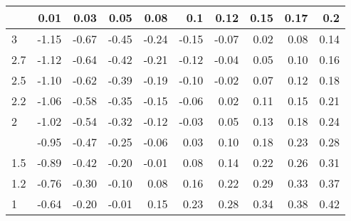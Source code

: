 
\begin{tabular}{lrrrrrrrrr}
\toprule
  & 0.01 & 0.03 & 0.05 & 0.08 & 0.1 & 0.12 & 0.15 & 0.17 & 0.2\\
\midrule
3 & -1.15 & -0.67 & -0.45 & -0.24 & -0.15 & -0.07 & 0.02 & 0.08 & 0.14\\
2.7 & -1.12 & -0.64 & -0.42 & -0.21 & -0.12 & -0.04 & 0.05 & 0.10 & 0.16\\
2.5 & -1.10 & -0.62 & -0.39 & -0.19 & -0.10 & -0.02 & 0.07 & 0.12 & 0.18\\
2.2 & -1.06 & -0.58 & -0.35 & -0.15 & -0.06 & 0.02 & 0.11 & 0.15 & 0.21\\
2 & -1.02 & -0.54 & -0.32 & -0.12 & -0.03 & 0.05 & 0.13 & 0.18 & 0.24\\
\addlinespace
1.7 & -0.95 & -0.47 & -0.25 & -0.06 & 0.03 & 0.10 & 0.18 & 0.23 & 0.28\\
1.5 & -0.89 & -0.42 & -0.20 & -0.01 & 0.08 & 0.14 & 0.22 & 0.26 & 0.31\\
1.2 & -0.76 & -0.30 & -0.10 & 0.08 & 0.16 & 0.22 & 0.29 & 0.33 & 0.37\\
1 & -0.64 & -0.20 & -0.01 & 0.15 & 0.23 & 0.28 & 0.34 & 0.38 & 0.42\\
\bottomrule
\end{tabular}
